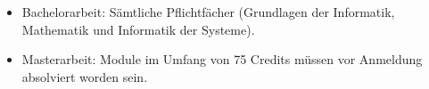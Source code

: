 	\begin{itemize}
		\item Bachelorarbeit: Sämtliche Pflichtfächer (Grundlagen der Informatik, Mathematik und Informatik der Systeme).
		\item Masterarbeit: Module im Umfang von 75 Credits müssen vor Anmeldung absolviert worden sein.
	\end{itemize}

